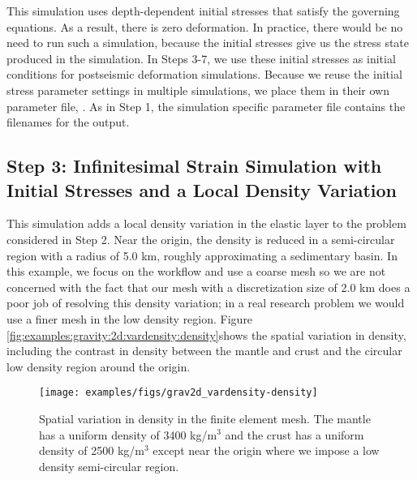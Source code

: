 This simulation uses depth-dependent initial stresses that satisfy the
governing equations. As a result, there is zero deformation. In
practice, there would be no need to run such a simulation, because the
initial stresses give us the stress state produced in the simulation.
In Steps 3-7, we use these initial stresses as initial conditions for
postseismic deformation simulations. Because we reuse the initial
stress parameter settings in multiple simulations, we place them in
their own parameter file, . As in
Step 1, the simulation specific parameter file contains the filenames
for the output.


\subsection{Step 3: Infinitesimal Strain Simulation with Initial Stresses and
a Local Density Variation}

This simulation adds a local density variation in the elastic layer
to the problem considered in Step 2. Near the origin, the density
is reduced in a semi-circular region with a radius of 5.0 km, roughly
approximating a sedimentary basin. In this example, we focus on the
workflow and use a coarse mesh so we are not concerned with the fact
that our mesh with a discretization size of 2.0 km does a poor job
of resolving this density variation; in a real research problem we
would use a finer mesh in the low density region. Figure \vref{fig:examples:gravity:2d:vardensity:density}shows
the spatial variation in density, including the contrast in density
between the mantle and crust and the circular low density region around
the origin.

\begin{figure}
  \texttt{[image: examples/figs/grav2d\_vardensity-density]}
  \caption{Spatial variation in density in the finite element mesh. The mantle
    has a uniform density of 3400 kg/m$^{3}$ and the crust has a uniform
    density of 2500 kg/m$^{3}$ except near the origin where we impose
    a low density semi-circular region.}
  \label{fig:examples:gravity:2d:vardensity:density}
\end{figure}

